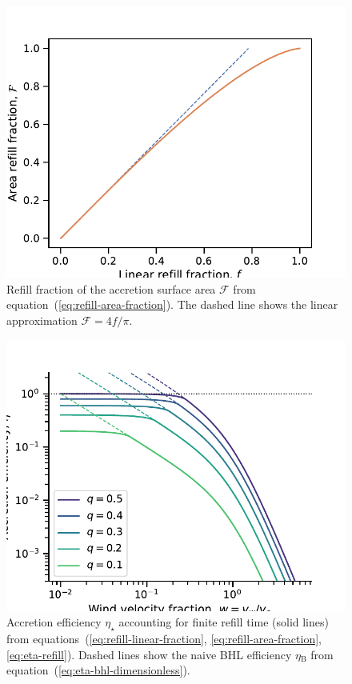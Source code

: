 \documentclass[useAMS, usenatbib, a4paper]{mnras}
\newcommand\bhl{\ensuremath{_{\mathrm{\scriptscriptstyle B}}}}
\begin{document}
\begin{figure}
  \centering
  \includegraphics[width=\linewidth]{notebooks/refill-fraction}
  \caption{Refill fraction of the accretion surface area \(\mathcal{F}\)
    from equation~(\ref{eq:refill-area-fraction}).
    The dashed line shows the linear approximation \(\mathcal{F} = 4 f / \pi\).
  }
  \label{fig:area-F}
\end{figure}

\begin{figure}
  \centering
  \includegraphics[width=\linewidth]{notebooks/eta-finite-refill}
  \caption{
    Accretion efficiency \(\eta_\star\) accounting for finite refill time (solid lines)
    from equations~(\ref{eq:refill-linear-fraction}, \ref{eq:refill-area-fraction}, \ref{eq:eta-refill}).
    Dashed lines show the naive BHL efficiency \(\eta\bhl\) from
    equation~(\ref{eq:eta-bhl-dimensionless}).
  }
  \label{fig:eta-finite-refill}
\end{figure}
\end{document}
